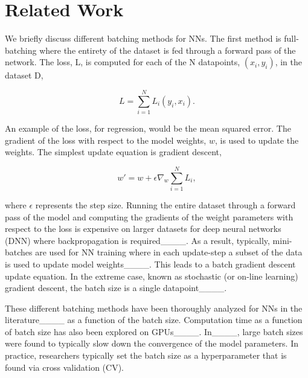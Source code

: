 \section{Related Work}
We briefly discuss different batching methods for NNs. The first method is full-batching where the entirety of the dataset is fed through a forward pass of the network. The loss, L, is computed for each of the N datapoints, $(x_i, y_i)$, in the dataset D,

\begin{equation}
\label{eq:full_batch_loss}
L = \sum_{i=1}^{N} L_i(y_i, x_i).
\end{equation}

An example of the loss, for regression, would be the mean squared error. The gradient of the loss with respect to the model weights, $w$, is used to update the weights. The simplest update equation is gradient descent,

\begin{equation}
\label{eq:update_weights}
w' = w + \epsilon \nabla_{w} \sum_{i=1}^{N} L_i,
\end{equation}

where $\epsilon$ represents the step size. Running the entire dataset through a forward pass of the model and computing the gradients of the weight parameters with respect to the loss is expensive on larger datasets for deep neural networks (DNN) where backpropagation is required____. As a result, typically, mini-batches are used for NN training where in each update-step a subset of the data is used to update model weights____. This leads to a batch gradient descent update equation. In the extreme case, known as stochastic (or on-line learning) gradient descent, the batch size is a single datapoint____.

These different batching methods have been thoroughly analyzed for NNs in the literature____ as a function of the batch size. Computation time as a function of batch size has also been explored on GPUs____. In____, large batch sizes were found to typically slow down the convergence of the model parameters. In practice, researchers typically set the batch size as a hyperparameter that is found via cross validation (CV).

